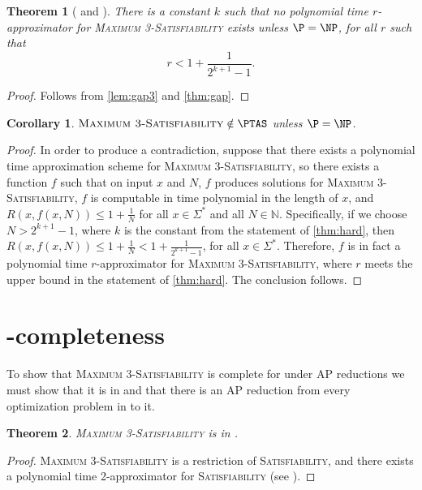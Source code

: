 \documentclass[]{article}
\theoremstyle{plain}
\newtheorem{corollary}{Corollary}
\newtheorem{theorem}{Theorem}
\theoremstyle{definition}
\begin{document}
\begin{theorem}[{\cite[Theorem~6.3]{book}} and {\cite[Corollary~29.8]{vazirani}}]\label{thm:hard}
  There is a constant $k$ such that no polynomial time $r$-approximator for \textsc{Maximum 3-Satisfiability} exists unless $\P = \NP$, for all $r$ such that
  \begin{displaymath}
    r < 1 + \frac{1}{2^{k + 1} - 1}.
  \end{displaymath}
\end{theorem}
\begin{proof}
  Follows from \autoref{lem:gap3} and \autoref{thm:gap}.
\end{proof}

\begin{corollary}
  $\textsc{Maximum 3-Satisfiability} \notin \PTAS$ unless $\P = \NP$.
\end{corollary}
\begin{proof}
  In order to produce a contradiction, suppose that there exists a polynomial time approximation scheme for \textsc{Maximum 3-Satisfiability}, so there exists a function $f$ such that on input $x$ and $N$, $f$ produces solutions for \textsc{Maximum 3-Satisfiability}, $f$ is computable in time polynomial in the length of $x$, and $R(x, f(x, N)) \leq 1 + \frac{1}{N}$ for all $x \in \Sigma^*$ and all $N \in \mathbb{N}$.
  Specifically, if we choose $N > 2^{k + 1} - 1$, where $k$ is the constant from the statement of \autoref{thm:hard}, then $R(x, f(x, N)) \leq 1 + \frac{1}{N} < 1 + \frac{1}{2^{k + 1} - 1}$, for all $x \in \Sigma^*$.
  Therefore, $f$ is in fact a polynomial time $r$-approximator for \textsc{Maximum 3-Satisfiability}, where $r$ meets the upper bound in the statement of \autoref{thm:hard}.
  The conclusion follows.
\end{proof}

\section{\texorpdfstring{\APX}{APX}-completeness}

To show that \textsc{Maximum 3-Satisfiability} is complete for \APX{} under AP reductions we must show that it is in \APX{} and that there is an AP reduction from every optimization problem in \APX{} to it.

\begin{theorem}
  \textsc{Maximum 3-Satisfiability} is in \APX.
\end{theorem}
\begin{proof}
  \textsc{Maximum 3-Satisfiability} is a restriction of \textsc{Satisfiability}, and there exists a polynomial time 2-approximator for \textsc{Satisfiability} (see \cite[Program~3.1]{book}).
\end{proof}
\end{document}
